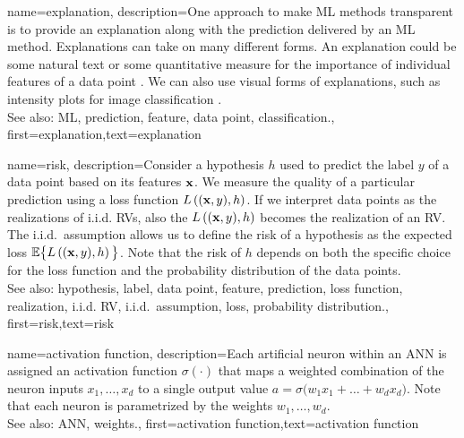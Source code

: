 {name={explanation},
	description={One approach to make ML methods transparent is to provide an 
		explanation along with the prediction delivered by an 
		ML method. Explanations can take on many different forms. An explanation 
		could be some natural text or some quantitative measure for the importance 
		of individual features of a data point \cite{Molnar2019}. We can also 
		use visual forms of explanations, such as intensity plots for image classification \cite{GradCamPaper}.
					\\ 
		See also: ML, prediction, feature, data point, classification.},
	first={explanation},text={explanation} 
}

{name={risk},
	description={Consider a hypothesis $h$ used to predict the label 
		$y$ of a data point based on its features ${\bf x}$. We measure 
		the quality of a particular prediction using a loss function $L\left(({\bf x},y),h \right)$. 
		If we interpret data points as the realizations of i.i.d. RVs, 
		also the $L\left(({\bf x},y),h \right)$ becomes the realization 
		of an RV. The i.i.d.\ assumption allows us to define the risk of a hypothesis 
		as the expected loss $\mathbb{E}  \big\{L\left(({\bf x},y),h \right) \big\}$. 
		Note that the risk of $h$ depends on both the specific choice for the loss function and the 
		probability distribution of the data points.
					\\ 
		See also: hypothesis, label, data point, feature, prediction, loss function, realization, i.i.d. RV, i.i.d.\ assumption, loss, probability distribution.},
	first={risk},text={risk} 
}

{name={activation function},
	description={Each artificial neuron within an ANN is 
		assigned an activation function $\sigma(\cdot)$ that maps a weighted combination of 
		the neuron inputs $x_{1},\ldots,x_{d}$ to a single output 
		value $a = \sigma\big(w_{1} x_{1}+\ldots+w_{d} x_{d} \big)$. 
		Note that each neuron is parametrized by the weights $w_{1},\ldots,w_{d}$.
					\\ 
		See also: ANN, weights.},
first={activation function},text={activation function} 
}

